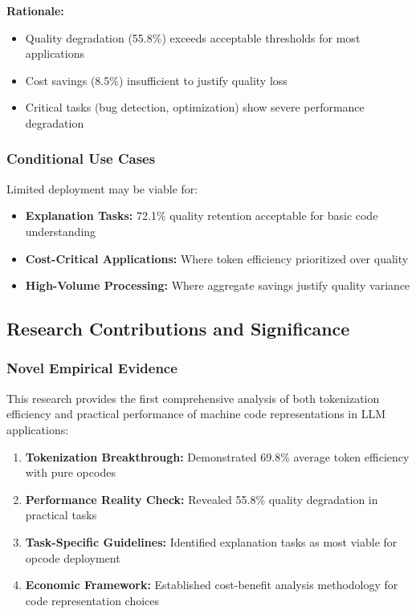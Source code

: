 \documentclass[11pt,a4paper]{article}
\begin{document}
\textbf{Rationale:}
\begin{itemize}
    \item Quality degradation (55.8\%) exceeds acceptable thresholds for most applications
    \item Cost savings (8.5\%) insufficient to justify quality loss
    \item Critical tasks (bug detection, optimization) show severe performance degradation
\end{itemize}

\subsubsection{Conditional Use Cases}
Limited deployment may be viable for:
\begin{itemize}
    \item \textbf{Explanation Tasks:} 72.1\% quality retention acceptable for basic code understanding
    \item \textbf{Cost-Critical Applications:} Where token efficiency prioritized over quality
    \item \textbf{High-Volume Processing:} Where aggregate savings justify quality variance
\end{itemize}

\subsection{Research Contributions and Significance}

\subsubsection{Novel Empirical Evidence}
This research provides the first comprehensive analysis of both tokenization efficiency and practical performance of machine code representations in LLM applications:

\begin{enumerate}
    \item \textbf{Tokenization Breakthrough:} Demonstrated 69.8\% average token efficiency with pure opcodes
    \item \textbf{Performance Reality Check:} Revealed 55.8\% quality degradation in practical tasks
    \item \textbf{Task-Specific Guidelines:} Identified explanation tasks as most viable for opcode deployment
    \item \textbf{Economic Framework:} Established cost-benefit analysis methodology for code representation choices
\end{enumerate}
\end{document}
